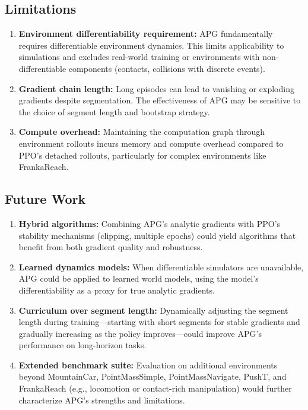 \documentclass[11pt,a4paper]{article}
\begin{document}
\subsection{Limitations}
\label{sec:limitations}

\begin{enumerate}
  \item \textbf{Environment differentiability requirement:} APG fundamentally requires differentiable environment dynamics. This limits applicability to simulations and excludes real-world training or environments with non-differentiable components (contacts, collisions with discrete events).

  \item \textbf{Gradient chain length:} Long episodes can lead to vanishing or exploding gradients despite segmentation. The effectiveness of APG may be sensitive to the choice of segment length and bootstrap strategy.

  \item \textbf{Compute overhead:} Maintaining the computation graph through environment rollouts incurs memory and compute overhead compared to PPO's detached rollouts, particularly for complex environments like FrankaReach.
\end{enumerate}

\subsection{Future Work}
\label{sec:future}

\begin{enumerate}
  \item \textbf{Hybrid algorithms:} Combining APG's analytic gradients with PPO's stability mechanisms (clipping, multiple epochs) could yield algorithms that benefit from both gradient quality and robustness.

  \item \textbf{Learned dynamics models:} When differentiable simulators are unavailable, APG could be applied to learned world models, using the model's differentiability as a proxy for true analytic gradients.

  \item \textbf{Curriculum over segment length:} Dynamically adjusting the segment length during training---starting with short segments for stable gradients and gradually increasing as the policy improves---could improve APG's performance on long-horizon tasks.

  \item \textbf{Extended benchmark suite:} Evaluation on additional environments beyond MountainCar, PointMassSimple, PointMassNavigate, PushT, and FrankaReach (e.g., locomotion or contact-rich manipulation) would further characterize APG's strengths and limitations.
\end{enumerate}
\end{document}
